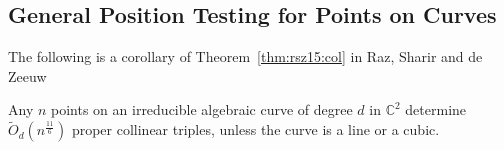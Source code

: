 \subsection{General Position Testing for Points on Curves}%
\label{sec:paper:3pol-algorithm:application:gpt}


The following is a corollary of Theorem~\ref{thm:rsz15:col} in Raz, Sharir and de Zeeuw~\cite{RSZ15}
\begin{corollary}
	Any $n$ points on an irreducible algebraic curve of degree $d$ in
	$\mathbb{C}^2$ determine
	$\tilde{O}_d(n^{\frac{11}{6}})$ proper collinear triples, unless the curve is a line or a cubic.
\end{corollary}

